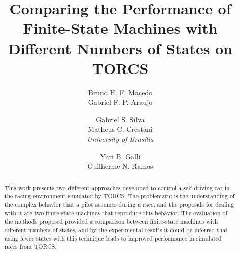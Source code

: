 \documentclass[a4paper]{sbgames}
\title{Comparing the Performance of Finite-State Machines with Different Numbers of States on TORCS}
\author{Bruno H. F. Macedo\\Gabriel F. P. Araujo\\
		\and Gabriel S. Silva\\Matheus C. Crestani\\\textit{University of Bras\'{i}lia}
		\and Yuri B. Galli\\ Guilherme N. Ramos\\
}
\begin{document}
	\maketitle

	\begin{abstract}
		
		This work presents two different approaches developed to control a self-driving car in the racing environment simulated by TORCS. The problematic is the understanding of the complex behavior that a pilot assumes during a race, and the proposals for dealing with it are two finite-state machines that reproduce this behavior. The evaluation of the methods proposed provided a comparison between finite-state machines with different numbers of states, and by the experimental results it could be inferred that using fewer states with this technique leads to improved performance in simulated races from TORCS.
		
	\end{abstract}

	\keywordlist
	\contactlist
	
	
	
	
	
	

	
	
	
	
\end{document}
